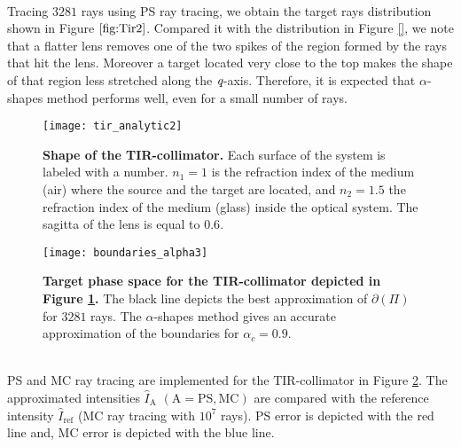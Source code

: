  \\ \indent Tracing $3281$ rays using PS ray tracing, we obtain the target rays distribution shown in Figure $\ref{fig:Tir2}$. 
Compared it with the distribution in Figure \ref{}, we note that a flatter lens removes one of the two spikes of the region formed by the rays that hit the lens.
Moreover a target located very close to the top makes the shape of that region less stretched along the $\textit{q}$-axis.
Therefore, it is expected that $\alpha$-shapes method performs well, even for a small number of rays.
\begin{figure}[h]
  \begin{center}
  \texttt{[image: tir\_analytic2]}
   \end{center}
    \caption{\textbf{Shape of the TIR-collimator.} Each surface of the system is labeled with a number.
       $n_1 = 1$ is the refraction index of the medium (air) where the source and the target are located, and
       $n_2 = 1.5 $ the refraction index of the medium (glass) inside the optical system. The sagitta of the lens is equal to $0.6$.}
 \label{fig:analyticlens}
\end{figure}
 \begin{figure}[h]
  \begin{center}
       \texttt{[image: boundaries\_alpha3]}
   \end{center}
        \caption{\textbf{Target phase space for the TIR-collimator depicted in
        Figure \ref{fig:analyticlens}.} The black line depicts the best approximation of $\partial$$(\Pi)$ for $3281$ rays. 
The $\alpha$-shapes method gives an accurate approximation of the boundaries for $\alpha_c = 0.9$.}
  \label{fig:Tir2}
\end{figure}
\\ \indent PS and MC ray tracing are implemented for the TIR-collimator in Figure \ref{fig:Tir2}. The approximated intensities $\hat{I}_{\textrm{A}}$ $(\textrm{A} = \textrm{PS}, \textrm{MC})$ are compared with the reference intensity $\hat{I}_{\textrm{ref}}$ (MC ray tracing with $10^7$ rays).
PS error is depicted with the red line and, MC error is depicted with the blue line. \\ \indent
